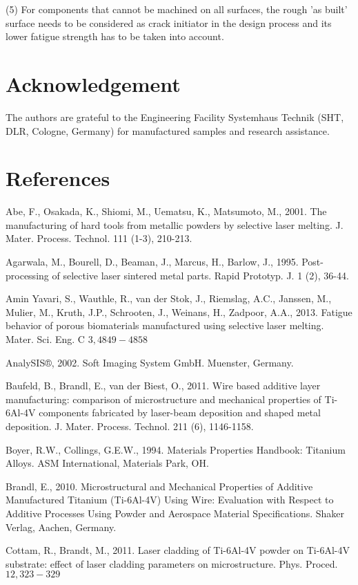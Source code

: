 \documentclass[10pt]{article}
\begin{document}
(5) For components that cannot be machined on all surfaces, the rough 'as built' surface needs to be considered as crack initiator in the design process and its lower fatigue strength has to be taken into account.

\section*{Acknowledgement}
The authors are grateful to the Engineering Facility Systemhaus Technik (SHT, DLR, Cologne, Germany) for manufactured samples and research assistance.

\section*{References}
Abe, F., Osakada, K., Shiomi, M., Uematsu, K., Matsumoto, M., 2001. The manufacturing of hard tools from metallic powders by selective laser melting. J. Mater. Process. Technol. 111 (1-3), 210-213.

Agarwala, M., Bourell, D., Beaman, J., Marcus, H., Barlow, J., 1995. Post-processing of selective laser sintered metal parts. Rapid Prototyp. J. 1 (2), 36-44.

Amin Yavari, S., Wauthle, R., van der Stok, J., Riemslag, A.C., Janssen, M., Mulier, M., Kruth, J.P., Schrooten, J., Weinans, H., Zadpoor, A.A., 2013. Fatigue behavior of porous biomaterials manufactured using selective laser melting. Mater. Sci. Eng. C $3,4849-4858$

AnalySIS®, 2002. Soft Imaging System GmbH. Muenster, Germany.

Baufeld, B., Brandl, E., van der Biest, O., 2011. Wire based additive layer manufacturing: comparison of microstructure and mechanical properties of Ti-6Al-4V components fabricated by laser-beam deposition and shaped metal deposition. J. Mater. Process. Technol. 211 (6), 1146-1158.

Boyer, R.W., Collings, G.E.W., 1994. Materials Properties Handbook: Titanium Alloys. ASM International, Materials Park, OH.

Brandl, E., 2010. Microstructural and Mechanical Properties of Additive Manufactured Titanium (Ti-6Al-4V) Using Wire: Evaluation with Respect to Additive Processes Using Powder and Aerospace Material Specifications. Shaker Verlag, Aachen, Germany.

Cottam, R., Brandt, M., 2011. Laser cladding of Ti-6Al-4V powder on Ti-6Al-4V substrate: effect of laser cladding parameters on microstructure. Phys. Proced. $12,323-329$
\end{document}
